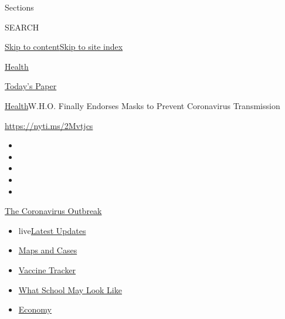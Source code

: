 Sections

SEARCH

\protect\hyperlink{site-content}{Skip to
content}\protect\hyperlink{site-index}{Skip to site index}

\href{https://www.nytimes.com/section/health}{Health}

\href{https://myaccount.nytimes.com/auth/login?response_type=cookie\&client_id=vi}{}

\href{https://www.nytimes.com/section/todayspaper}{Today's Paper}

\href{/section/health}{Health}\textbar{}W.H.O. Finally Endorses Masks to
Prevent Coronavirus Transmission

\url{https://nyti.ms/2Mvtjcs}

\begin{itemize}
\item
\item
\item
\item
\item
\end{itemize}

\href{https://www.nytimes.com/news-event/coronavirus?action=click\&pgtype=Article\&state=default\&region=TOP_BANNER\&context=storylines_menu}{The
Coronavirus Outbreak}

\begin{itemize}
\tightlist
\item
  live\href{https://www.nytimes.com/2020/08/01/world/coronavirus-covid-19.html?action=click\&pgtype=Article\&state=default\&region=TOP_BANNER\&context=storylines_menu}{Latest
  Updates}
\item
  \href{https://www.nytimes.com/interactive/2020/us/coronavirus-us-cases.html?action=click\&pgtype=Article\&state=default\&region=TOP_BANNER\&context=storylines_menu}{Maps
  and Cases}
\item
  \href{https://www.nytimes.com/interactive/2020/science/coronavirus-vaccine-tracker.html?action=click\&pgtype=Article\&state=default\&region=TOP_BANNER\&context=storylines_menu}{Vaccine
  Tracker}
\item
  \href{https://www.nytimes.com/interactive/2020/07/29/us/schools-reopening-coronavirus.html?action=click\&pgtype=Article\&state=default\&region=TOP_BANNER\&context=storylines_menu}{What
  School May Look Like}
\item
  \href{https://www.nytimes.com/live/2020/07/31/business/stock-market-today-coronavirus?action=click\&pgtype=Article\&state=default\&region=TOP_BANNER\&context=storylines_menu}{Economy}
\end{itemize}

